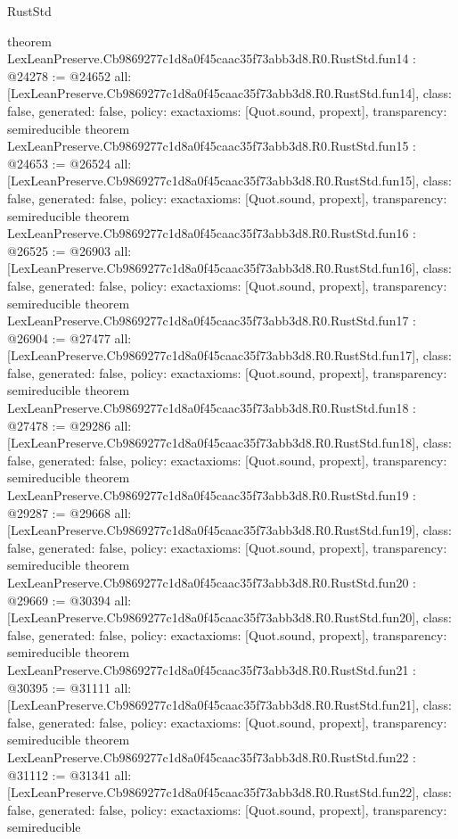 \begin{lexlean}{RustStd}
\begin{coremodule}
{}
theorem LexLeanPreserve.Cb9869277c1d8a0f45caac35f73abb3d8.R0.RustStd.fun14 : @24278 := @24652 {
  all: [LexLeanPreserve.Cb9869277c1d8a0f45caac35f73abb3d8.R0.RustStd.fun14],
  class: false,
  generated: false,
  policy: exact{axioms: [Quot.sound, propext]},
  transparency: semireducible
}
theorem LexLeanPreserve.Cb9869277c1d8a0f45caac35f73abb3d8.R0.RustStd.fun15 : @24653 := @26524 {
  all: [LexLeanPreserve.Cb9869277c1d8a0f45caac35f73abb3d8.R0.RustStd.fun15],
  class: false,
  generated: false,
  policy: exact{axioms: [Quot.sound, propext]},
  transparency: semireducible
}
theorem LexLeanPreserve.Cb9869277c1d8a0f45caac35f73abb3d8.R0.RustStd.fun16 : @26525 := @26903 {
  all: [LexLeanPreserve.Cb9869277c1d8a0f45caac35f73abb3d8.R0.RustStd.fun16],
  class: false,
  generated: false,
  policy: exact{axioms: [Quot.sound, propext]},
  transparency: semireducible
}
theorem LexLeanPreserve.Cb9869277c1d8a0f45caac35f73abb3d8.R0.RustStd.fun17 : @26904 := @27477 {
  all: [LexLeanPreserve.Cb9869277c1d8a0f45caac35f73abb3d8.R0.RustStd.fun17],
  class: false,
  generated: false,
  policy: exact{axioms: [Quot.sound, propext]},
  transparency: semireducible
}
theorem LexLeanPreserve.Cb9869277c1d8a0f45caac35f73abb3d8.R0.RustStd.fun18 : @27478 := @29286 {
  all: [LexLeanPreserve.Cb9869277c1d8a0f45caac35f73abb3d8.R0.RustStd.fun18],
  class: false,
  generated: false,
  policy: exact{axioms: [Quot.sound, propext]},
  transparency: semireducible
}
theorem LexLeanPreserve.Cb9869277c1d8a0f45caac35f73abb3d8.R0.RustStd.fun19 : @29287 := @29668 {
  all: [LexLeanPreserve.Cb9869277c1d8a0f45caac35f73abb3d8.R0.RustStd.fun19],
  class: false,
  generated: false,
  policy: exact{axioms: [Quot.sound, propext]},
  transparency: semireducible
}
theorem LexLeanPreserve.Cb9869277c1d8a0f45caac35f73abb3d8.R0.RustStd.fun20 : @29669 := @30394 {
  all: [LexLeanPreserve.Cb9869277c1d8a0f45caac35f73abb3d8.R0.RustStd.fun20],
  class: false,
  generated: false,
  policy: exact{axioms: [Quot.sound, propext]},
  transparency: semireducible
}
theorem LexLeanPreserve.Cb9869277c1d8a0f45caac35f73abb3d8.R0.RustStd.fun21 : @30395 := @31111 {
  all: [LexLeanPreserve.Cb9869277c1d8a0f45caac35f73abb3d8.R0.RustStd.fun21],
  class: false,
  generated: false,
  policy: exact{axioms: [Quot.sound, propext]},
  transparency: semireducible
}
theorem LexLeanPreserve.Cb9869277c1d8a0f45caac35f73abb3d8.R0.RustStd.fun22 : @31112 := @31341 {
  all: [LexLeanPreserve.Cb9869277c1d8a0f45caac35f73abb3d8.R0.RustStd.fun22],
  class: false,
  generated: false,
  policy: exact{axioms: [Quot.sound, propext]},
  transparency: semireducible
}
\end{coremodule}
\end{lexlean}
